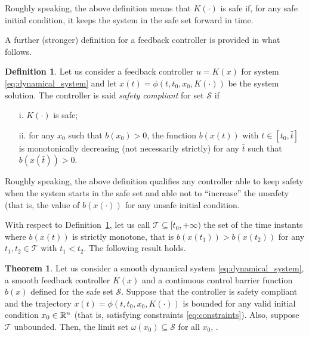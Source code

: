 \documentclass[letterpaper, 10 pt, conference]{ieeeconf}
\newcounter{Definition}
\theoremstyle{definition}
\theoremstyle{nopoint}
\newtheorem{definitionNoPoint}{Definition}
\newtheorem{theorem}{Theorem}[section]
\newcounter{Theorem}
\newcommand{\tildeAdd}{~}
\begin{document}
Roughly speaking, the above definition means that $K(\cdot)$ is safe if, for any safe initial condition, it keeps the system in the safe set forward in time. 

A further (stronger) definition for a feedback controller is provided in what follows.


\begin{definitionNoPoint}\label{def:safety_compliant}
Let us consider a feedback controller $u=K(x)$ for system  \eqref{eq:dynamical_system} and let $x(t)=\phi(t,t_0,x_0,K(\cdot))$ be the system solution. 
The controller is said {\em safety compliant} for set $\mathcal{S}$ if
\begin{itemize}
\item [i.]  $K(\cdot)$ is safe;
\item [ii.] for any $x_0$ such that $b(x_0)>0 $, the function $b(x(t))$ with $t\in [t_0, \bar{t}]$ is monotonically decreasing (not necessarily strictly) for any $\bar{t}$ such that $b(x(\bar{t}))>0$. 
\end{itemize}

\end{definitionNoPoint}

Roughly speaking, the above definition qualifies any controller able to keep safety when the system starts in the safe set and able not to ``increase'' the unsafety (that is, the value of $b(x(\cdot))$ for any unsafe initial condition. 



With respect to Definition\tildeAdd\ref{def:safety_compliant}, let us call $\mathcal{T}\subseteq [t_0, +\infty) $ the set of the time instants where $b(x(t))$ is strictly monotone, that is $b(x(t_1))>b(x(t_2))$ for any $t_1,t_2\in \mathcal{T}$ with $t_1<t_2$.
The following result holds.

\begin{theorem} \label{thm:safety-compliant}
Let us consider a smooth dynamical system  \eqref{eq:dynamical_system}, a smooth feedback controller $K(x)$ and a continuous control barrier function $b(x)$ defined for the safe set $\mathcal{S}$. 
Suppose that the controller is safety compliant and the trajectory
$x(t)=\phi(t,t_0,x_0,K(\cdot))$ is bounded for any valid initial condition $x_0\in\Bbb{R}^n$ (that is, satisfying constraints \eqref{eq:constraints}). Also, suppose  $\mathcal{T}$ unbounded.
Then, the limit set  $\omega(x_0)\subseteq \mathcal{S}$ for all $x_0$, \cite{khalil}.

\end{theorem}
\end{document}
